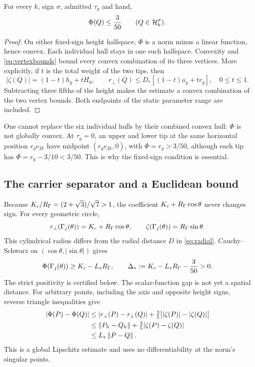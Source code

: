 \begin{proposition}\label{prop:hullenvelope}
For every $k$, sign $\sigma$, admitted $\tau_g$ and hand,
\begin{equation}\label{eq:envelope}
 \Phi(Q)\le\frac3{50}\qquad(Q\in\mathcal H_k^\sigma).
\end{equation}
\end{proposition}
\begin{proof}
On either fixed-sign height halfspace, $\Phi$ is a norm minus a linear function, hence convex. Each individual hull stays in one such halfspace. Convexity and \eqref{eq:vertexbounds} bound every convex combination of its three vertices. More explicitly, if $t$ is the total weight of the two tips, then
\begin{equation}\label{eq:hullinterpolation}
 |\zeta(Q)|=(1-t)h_g+tH_0,\qquad
 r_\perp(Q)\le D_*[(1-t)a_g+tr_g],\quad 0\le t\le1.
\end{equation}
Subtracting three fifths of the height makes the estimate a convex combination of the two vertex bounds. Both endpoints of the static parameter range are included.
\end{proof}

One cannot replace the six individual hulls by their combined convex hull: $\Phi$ is not globally convex. At $\tau_g=0$, an upper and lower tip at the same horizontal position $r_ge_{2k}$ have midpoint $(r_ge_{2k},0)$, with $\Phi=r_g>3/50$, although each tip has $\Phi=r_g-3/10<3/50$. This is why the fixed-sign condition is essential.

\subsection{The carrier separator and a Euclidean bound}\label{sec:clearance}
Because $K_c/R_\Gamma=(2+\sqrt3)/\sqrt7>1$, the coefficient $K_c+R_\Gamma\cos\theta$ never changes sign. For every geometric circle,
\begin{equation}\label{eq:cylindrical}
 r_\perp(\Gamma_j(\theta))=K_c+R_\Gamma\cos\theta,\qquad
 \zeta(\Gamma_j(\theta))=R_\Gamma\sin\theta.
\end{equation}
This cylindrical radius differs from the radial distance $D$ in \eqref{eq:radial}. Cauchy--Schwarz on $(\cos\theta,|\sin\theta|)$ gives
\begin{equation}\label{eq:carriergap}
 \Phi(\Gamma_j(\theta))\ge K_c-L_*R_\Gamma,
 \qquad \Delta_*:=K_c-L_*R_\Gamma-\frac3{50}>0.
\end{equation}
The strict positivity is certified below. The scalar-function gap is not yet a spatial distance. For arbitrary points, including the axis and opposite height signs, reverse triangle inequalities give
\begin{equation}\label{eq:lipschitz}
 \begin{aligned}
 |\Phi(P)-\Phi(Q)|
 &\le |r_\perp(P)-r_\perp(Q)|+\tfrac35\big||\zeta(P)|-|\zeta(Q)|\big|\\
 &\le\left\lVert P_h-Q_h\right\rVert+\tfrac35|\zeta(P)-\zeta(Q)|\\
 &\le L_*\left\lVert P-Q\right\rVert.
 \end{aligned}
\end{equation}
This is a global Lipschitz estimate and uses no differentiability at the norm's singular points.

